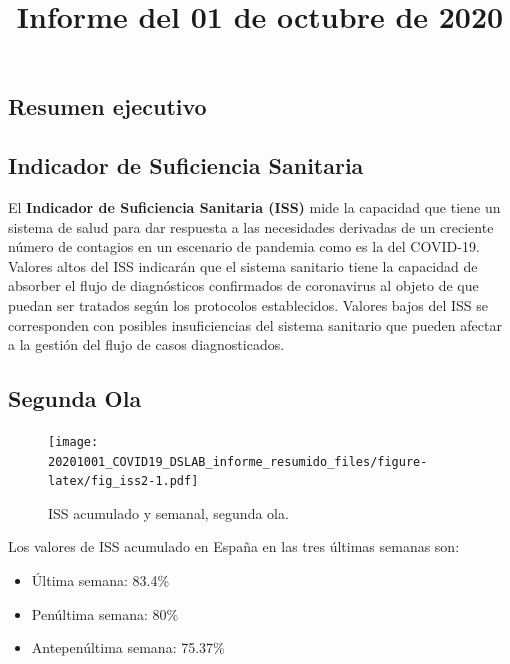 \documentclass[
  11pt,
]{article}
\title{Informe del 01 de octubre de 2020}
\author{}
\date{\vspace{-2.5em}}
\providecommand{\tightlist}{%
  \setlength{\itemsep}{0pt}\setlength{\parskip}{0pt}}
\begin{document}
\maketitle

\renewcommand{\figurename}{Figura}
\renewcommand{\tablename}{Tabla}

\vspace{-0.5cm}

\hypertarget{resumen-ejecutivo}{%
\subsection{Resumen ejecutivo}\label{resumen-ejecutivo}}

\hypertarget{indicador-de-suficiencia-sanitaria}{%
\subsection{Indicador de Suficiencia
Sanitaria}\label{indicador-de-suficiencia-sanitaria}}

El \textbf{Indicador de Suficiencia Sanitaria (ISS)} mide la capacidad
que tiene un sistema de salud para dar respuesta a las necesidades
derivadas de un creciente número de contagios en un escenario de
pandemia como es la del COVID-19. Valores altos del ISS indicarán que el
sistema sanitario tiene la capacidad de absorber el flujo de
diagnósticos confirmados de coronavirus al objeto de que puedan ser
tratados según los protocolos establecidos. Valores bajos del ISS se
corresponden con posibles insuficiencias del sistema sanitario que
pueden afectar a la gestión del flujo de casos diagnosticados.

\hypertarget{segunda-ola}{%
\subsection{Segunda Ola}\label{segunda-ola}}

\begin{figure}
\centering
\texttt{[image: 20201001\_COVID19\_DSLAB\_informe\_resumido\_files/figure-latex/fig\_iss2-1.pdf]}
\caption{\label{fig:fig_iss2} ISS acumulado y semanal, segunda ola.}
\end{figure}

Los valores de ISS acumulado en España en las tres últimas semanas son:

\begin{itemize}
\tightlist
\item
  Última semana: 83.4\%
\item
  Penúltima semana: 80\%
\item
  Antepenúltima semana: 75.37\%
\end{itemize}
\end{document}
